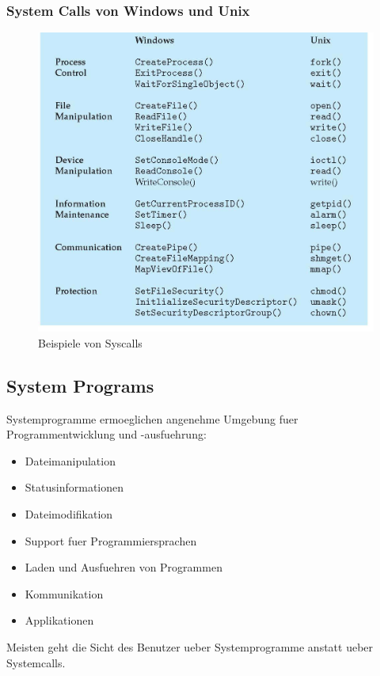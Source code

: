 \documentclass[a4paper]{scrreprt}
\begin{document}
\subsubsection{System Calls von Windows und Unix}
\begin{figure}[ht]
\centering
\includegraphics[scale=0.3]{syscall_examples.png}
\caption{Beispiele von Syscalls}
\end{figure}

\subsection{System Programs}
Systemprogramme ermoeglichen angenehme Umgebung fuer Programmentwicklung und -ausfuehrung:
\begin{itemize}
	\item Dateimanipulation
	\item Statusinformationen
	\item Dateimodifikation
	\item Support fuer Programmiersprachen
	\item Laden und Ausfuehren von Programmen
	\item Kommunikation
	\item Applikationen
\end{itemize}
Meisten geht die Sicht des Benutzer ueber Systemprogramme anstatt ueber Systemcalls.
\end{document}
